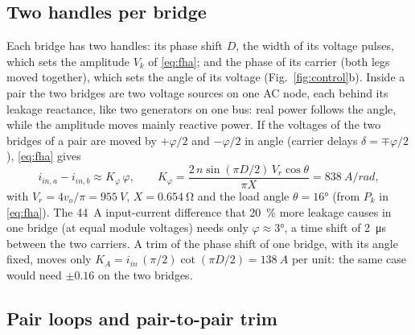 \documentclass[10pt,a4paper]{scrartcl}
\newcommand{\vo}{v_o}
\begin{document}
\begin{onehalfspace}
\subsection{Two handles per bridge}

Each bridge has two handles: its phase shift $D$, the width of its voltage pulses, which sets the amplitude $V_k$ of \eqref{eq:fha}; and the phase of its carrier (both legs moved together), which sets the angle of its voltage (Fig.~\ref{fig:control}b). Inside a pair the two bridges are two voltage sources on one AC node, each behind its leakage reactance, like two generators on one bus: real power follows the angle, while the amplitude moves mainly reactive power. If the voltages of the two bridges of a pair are moved by $+\varphi/2$ and $-\varphi/2$ in angle (carrier delays $\delta = \mp\varphi/2$), \eqref{eq:fha} gives
\begin{equation}
i_{in,a} - i_{in,b} \approx K_\varphi\,\varphi, \qquad K_\varphi = \frac{2\,n\sin(\pi D/2)\,V_r\cos\theta}{\pi X} = \SI{838}{A/rad},
\label{eq:kphi}
\end{equation}
with $V_r = 4\vo/\pi = \SI{955}{V}$, $X = \SI{0.654}{\ohm}$ and the load angle $\theta = \ang{16}$ (from $P_k$ in \eqref{eq:fha}). The \SI{44}{A} input-current difference that \SI{20}{\percent} more leakage causes in one bridge (at equal module voltages) needs only $\varphi \approx \ang{3}$, a time shift of \SI{2}{\micro s} between the two carriers. A trim of the phase shift of one bridge, with its angle fixed, moves only $K_A = i_{in}\,(\pi/2)\cot(\pi D/2) = \SI{138}{A}$ per unit: the same case would need $\pm 0.16$ on the two bridges.

\subsection{Pair loops and pair-to-pair trim}


\end{onehalfspace}
\end{document}
